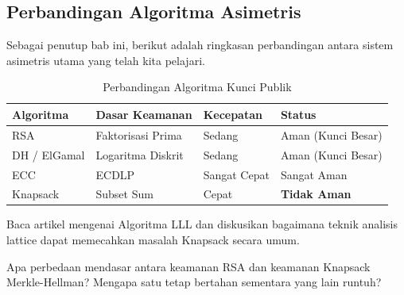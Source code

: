 \subsection{Perbandingan Algoritma Asimetris}
Sebagai penutup bab ini, berikut adalah ringkasan perbandingan antara sistem asimetris utama yang telah kita pelajari.

\begin{table}[h]
\centering
\begin{tabular}{|l|l|l|l|}
\hline
\textbf{Algoritma} & \textbf{Dasar Keamanan} & \textbf{Kecepatan} & \textbf{Status} \\ \hline
RSA & Faktorisasi Prima & Sedang & Aman (Kunci Besar) \\ \hline
DH / ElGamal & Logaritma Diskrit & Sedang & Aman (Kunci Besar) \\ \hline
ECC & ECDLP & Sangat Cepat & Sangat Aman \\ \hline
Knapsack & Subset Sum & Cepat & \textbf{Tidak Aman} \\ \hline
\end{tabular}
\caption{Perbandingan Algoritma Kunci Publik}
\end{table}

\begin{aktivitas}
Baca artikel mengenai Algoritma LLL dan diskusikan bagaimana teknik analisis lattice dapat memecahkan masalah Knapsack secara umum.
\end{aktivitas}

\begin{latihan}
Apa perbedaan mendasar antara keamanan RSA dan keamanan Knapsack Merkle-Hellman? Mengapa satu tetap bertahan sementara yang lain runtuh?
\end{latihan}

